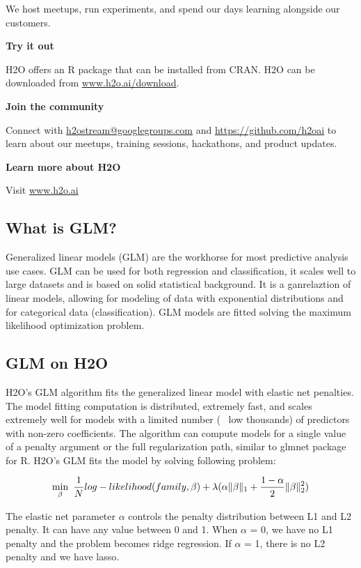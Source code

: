 \documentclass[11pt]{article}
\begin{document}
We host meetups, run experiments, and spend our days learning alongside our customers.


\textbf{Try it out}

H2O offers an R package that can be installed from CRAN. H2O can be downloaded from \url{www.h2o.ai/download}.

\textbf{Join the community}

Connect with \url{h2ostream@googlegroups.com} and \url{https://github.com/h2oai} to learn about our meetups, training sessions, hackathons, and product updates.

\textbf{Learn more about H2O}

Visit \url{www.h2o.ai}

\subsection{What is GLM?}
Generalized linear models (GLM) are the workhorse for most predictive analysis use cases. GLM can be used for both regression and classification, it scales well to large datasets and is based on solid statistical background. It is a ganrelaztion of linear models, allowing for modeling of data with exponential distributions and for categorical data (classification). GLM models are fitted solving the maximum likelihood optimization problem.

\subsection{GLM on H2O}
H2O's GLM algorithm fits the generalized linear model with elastic net penalties. The model fitting computation is distributed, extremely fast, and scales extremely well for models with a limited number (~ low thousands) of predictors with non-zero coefficients. The algorithm can compute models for a single value of a penalty argument or the full regularization path, similar to glmnet package for R\cite{glmnet}. 
H2O's GLM fits the model by solving following problem:

\[ \min\limits_{\beta}\ {{1\over{N}} log-likelihood(family,\beta)  + \lambda (\alpha \| \beta \|_1}  + {1- \alpha \over 2} \| \beta \|_2^2) \]

The elastic net parameter $\alpha$ controls the penalty distribution between L1 and L2 penalty. It can have any value between 0 and 1. When $\alpha$ = 0, we have no L1 penalty and the problem becomes ridge regression. If $\alpha$ = 1, there is no L2 penalty and we have lasso.
\end{document}
